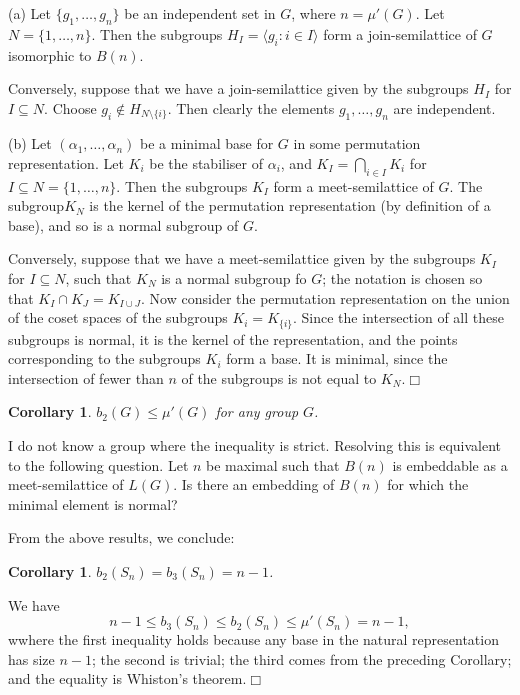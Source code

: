 \documentclass[12pt]{article}
\newtheorem{cor}[prop]{Corollary}
\newenvironment{pf}{\prepf\rm}{\endprepf}
\newcommand{\qed}{\hfill$\Box$}
\begin{document}
\begin{pf}
(a) Let $\{g_1,\ldots,g_n\}$ be an independent set in $G$, where $n=\mu'(G)$.
Let $N=\{1,\ldots,n\}$. Then the subgroups $H_I=\langle g_i:i\in I\rangle$
form a join-semilattice of $G$ isomorphic to $B(n)$.

Conversely, suppose that we have a join-semilattice given by the subgroups
$H_I$ for $I\subseteq N$. Choose $g_i\notin H_{N\setminus\{i\}}$. Then
clearly the elements $g_1,\ldots,g_n$ are independent.

\smallskip

(b) Let $(\alpha_1,\ldots,\alpha_n)$ be a minimal base for $G$ in some
permutation representation. Let $K_i$ be the stabiliser of $\alpha_i$, and
$K_I=\bigcap_{i\in I}K_i$ for $I\subseteq N=\{1,\ldots,n\}$. Then the 
subgroups $K_I$ form a meet-semilattice of $G$. The subgroup$ K_N$ is the
kernel of the permutation representation (by definition of a base), and so
is a normal subgroup of $G$.

Conversely, suppose that we have a meet-semilattice given by the subgroups
$K_I$ for $I\subseteq N$, such that $K_N$ is a normal subgroup fo $G$;
the notation is chosen so that $K_I\cap K_J=K_{I\cup J}$. Now consider the
permutation representation on the union of the coset spaces of the subgroups
$K_i=K_{\{i\}}$. Since the intersection of all these subgroups is normal,
it is the kernel of the representation, and the points corresponding to
the subgroups $K_i$ form a base. It is minimal, since the intersection
of fewer than $n$ of the subgroups is not equal to $K_N$.\qed
\end{pf}

\begin{cor}
$b_2(G)\le\mu'(G)$ for any group $G$.
\end{cor}

I do not know a group where the inequality is strict. Resolving this is
equivalent to the following question. Let $n$ be maximal such that $B(n)$
is embeddable as a meet-semilattice of $L(G)$. Is there an embedding of $B(n)$
for which the minimal element is normal?

From the above results, we conclude:

\begin{cor}
$b_2(S_n)=b_3(S_n)=n-1$.
\end{cor}

\begin{pf}
We have
\[n-1\le b_3(S_n)\le b_2(S_n)\le \mu'(S_n)=n-1,\]
wwhere the first inequality holds because any base in the natural
representation has size $n-1$; the second is trivial; the third comes from
the preceding Corollary; and the equality is Whiston's theorem.\qed
\end{pf}
\end{document}
